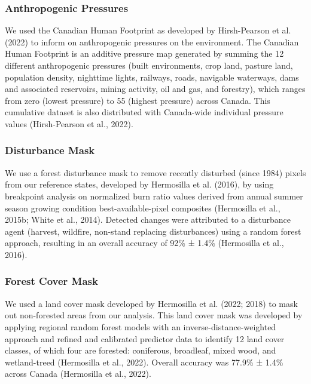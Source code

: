 \documentclass[
]{agujournal2019}
\begin{document}
\subsubsection{Anthropogenic Pressures}\label{anthropogenic-pressures}

We used the Canadian Human Footprint as developed by Hirsh-Pearson et
al. (2022) to inform on anthropogenic pressures on the environment. The
Canadian Human Footprint is an additive pressure map generated by
summing the 12 different anthropogenic pressures (built environments,
crop land, pasture land, population density, nighttime lights, railways,
roads, navigable waterways, dams and associated reservoirs, mining
activity, oil and gas, and forestry), which ranges from zero (lowest
pressure) to 55 (highest pressure) across Canada. This cumulative
dataset is also distributed with Canada-wide individual pressure values
(Hirsh-Pearson et al., 2022).

\subsubsection{Disturbance Mask}\label{disturbance-mask}

We use a forest disturbance mask to remove recently disturbed (since
1984) pixels from our reference states, developed by Hermosilla et al.
(2016), by using breakpoint analysis on normalized burn ratio values
derived from annual summer season growing condition best-available-pixel
composites (Hermosilla et al., 2015b; White et al., 2014). Detected
changes were attributed to a disturbance agent (harvest, wildfire,
non-stand replacing disturbances) using a random forest approach,
resulting in an overall accuracy of 92\% ± 1.4\% (Hermosilla et al.,
2016).

\subsubsection{Forest Cover Mask}\label{forest-cover-mask}

We used a land cover mask developed by Hermosilla et al. (2022; 2018) to
mask out non-forested areas from our analysis. This land cover mask was
developed by applying regional random forest models with an
inverse-distance-weighted approach and refined and calibrated predictor
data to identify 12 land cover classes, of which four are forested:
coniferous, broadleaf, mixed wood, and wetland-treed (Hermosilla et al.,
2022). Overall accuracy was 77.9\% ± 1.4\% across Canada (Hermosilla et
al., 2022).
\end{document}
